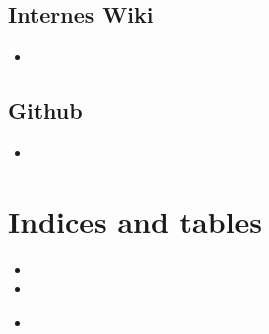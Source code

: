 \documentclass[letterpaper,10pt,english]{sphinxmanual}
\begin{document}
\section{Internes Wiki}
\label{\detokenize{colophon:internes-wiki}}\label{\detokenize{colophon:id8}}\begin{itemize}
\item {} 
\sphinxAtStartPar
{}

\end{itemize}


\section{Github}
\label{\detokenize{colophon:github}}\label{\detokenize{colophon:id9}}\begin{itemize}
\item {} 
\sphinxAtStartPar
{}

\end{itemize}


\chapter{Indices and tables}
\label{\detokenize{index:indices-and-tables}}\begin{itemize}
\item {} 
\sphinxAtStartPar
{}

\item {} 
\sphinxAtStartPar
{}

\item {} 
\sphinxAtStartPar
{\hyperref[\detokenize{api-toscience:search}]{}}

\end{itemize}



\renewcommand{\indexname}{Index}
\printindex
\end{document}
